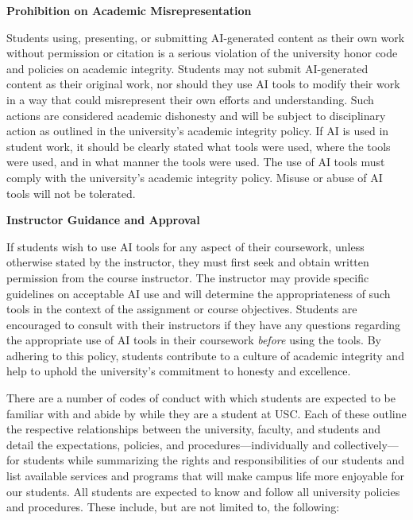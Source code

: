 \documentclass[11pt,letterpaper]{article}
\begin{document}
{\bfseries Prohibition on Academic Misrepresentation} \par
Students using, presenting, or submitting AI-generated content as their own work without permission or citation is a serious violation of the university honor code and policies on academic integrity. Students may not submit AI-generated content as their original work, nor should they use AI tools to modify their work in a way that could misrepresent their own efforts and understanding. Such actions are considered academic dishonesty and will be subject to disciplinary action as outlined in the university's academic integrity policy. If AI is used in student work, it should be clearly stated what tools were used, where the tools were used, and in what manner the tools were used. The use of AI tools must comply with the university's academic integrity policy. Misuse or abuse of AI tools will not be tolerated. \pspace

{\bfseries Instructor Guidance and Approval} \par
If students wish to use AI tools for any aspect of their coursework, unless otherwise stated by the instructor, they must first seek and obtain written permission from the course instructor. The instructor may provide specific guidelines on acceptable AI use and will determine the appropriateness of such tools in the context of the assignment or course objectives. Students are encouraged to consult with their instructors if they have any questions regarding the appropriate use of AI tools in their coursework \textit{before} using the tools. By adhering to this policy, students contribute to a culture of academic integrity and help to uphold the university's commitment to honesty and excellence. \sectionbreak




There are a number of codes of conduct with which students are expected to be familiar with and abide by while they are a student at USC. Each of these outline the respective relationships between the university, faculty, and students and detail the expectations, policies, and procedures---individually and collectively---for students while summarizing the rights and responsibilities of our students and list available services and programs that will make campus life more enjoyable for our students. All students are expected to know and follow all university policies and procedures. These include, but are not limited to, the following: \pspace
\end{document}
